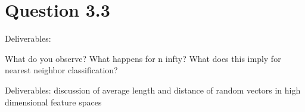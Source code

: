 \section*{Question 3.3}
Deliverables:

What do you observe? What happens for n  infty? What does this imply for nearest neighbor classification?

Deliverables: discussion of average length and distance of random vectors in high dimensional feature spaces